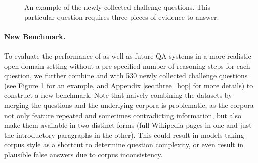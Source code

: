 \begin{figure}
    \centering
    \caption{An example of the newly collected challenge questions. This particular question requires three pieces of evidence to answer.
    }
    \label{fig:three_hop_example}
\end{figure}

\paragraph{New Benchmark.} To evaluate the performance of \irrr{} as well as future QA systems in a more realistic open-domain setting without a pre-specified number of reasoning steps for each question, we further combine \squadopen{} and \hotpotqa{} with 530 newly collected challenge questions (see Figure \ref{fig:three_hop_example} for an example, and Appendix \ref{sec:three_hop} for more details) to construct a new benchmark.
Note that naively combining the datasets by merging the questions and the underlying corpora is problematic, as the corpora not only feature repeated and sometimes contradicting information, but also make them available in two distinct forms (full Wikipedia pages in one and just the introductory paragraphs in the other).
This could result in models taking corpus style as a shortcut to determine question complexity, or even result in plausible false answers due to corpus inconsistency.


